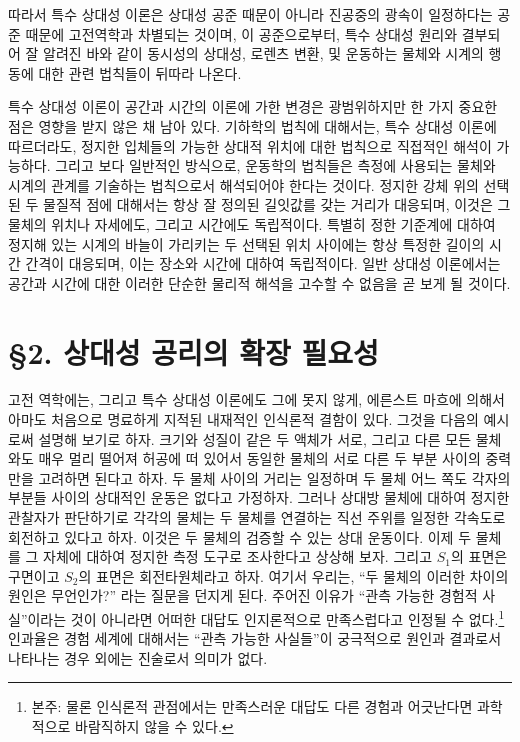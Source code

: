 따라서 특수 상대성 이론은 상대성 공준 때문이 아니라 진공중의 광속이 일정하다는 공준 때문에 고전역학과 차별되는 것이며, 이 공준으로부터, 특수 상대성 원리와 결부되어 잘 알려진 바와 같이 동시성의 상대성, 로렌츠 변환, 및 운동하는 물체와 시계의 행동에 대한 관련 법칙들이 뒤따라 나온다. 

특수 상대성 이론이 공간과 시간의 이론에 가한 변경은 광범위하지만 한 가지 중요한 점은 영향을 받지 않은 채 남아 있다.
기하학의 법칙에 대해서는, 특수 상대성 이론에 따르더라도, 정지한 입체들의 가능한 상대적 위치에 대한 법칙으로 직접적인 해석이 가능하다.
그리고 보다 일반적인 방식으로, 운동학의 법칙들은 측정에 사용되는 물체와 시계의 관계를 기술하는 법칙으로서 해석되어야 한다는 것이다.
정지한 강체 위의 선택된 두 물질적 점에 대해서는 항상 잘 정의된 길잇값를 갖는 거리가 대응되며, 이것은 그 물체의 위치나 자세에도, 그리고 시간에도 독립적이다. 특별히 정한 기준계에 대하여 정지해 있는 시계의 바늘이 가리키는 두 선택된 위치 사이에는 항상 특정한 길이의 시간 간격이 대응되며, 이는 장소와 시간에 대하여 독립적이다.
일반 상대성 이론에서는 공간과 시간에 대한 이러한 단순한 물리적 해석을 고수할 수 없음을 곧 보게 될 것이다.

\section*{\S 2. 상대성 공리의 확장 필요성}

고전 역학에는, 그리고 특수 상대성 이론에도 그에 못지 않게, 에른스트 마흐에 의해서 아마도 처음으로 명료하게 지적된 내재적인 인식론적 결함이 있다. 그것을 다음의 예시로써 설명해 보기로 하자. 크기와 성질이 같은 두 액체가 서로, 그리고 다른 모든 물체와도 매우 멀리 떨어져 허공에 떠 있어서 동일한 물체의 서로 다른 두 부분 사이의 중력만을 고려하면 된다고 하자. 두 물체 사이의 거리는 일정하며 두 물체 어느 쪽도 각자의 부분들 사이의 상대적인 운동은 없다고 가정하자. 그러나 상대방 물체에 대하여 정지한 관찰자가 판단하기로 각각의 물체는 두 물체를 연결하는 직선 주위를 일정한 각속도로 회전하고 있다고 하자. 이것은 두 물체의 검증할 수 있는 상대 운동이다. 이제 두 물체를 그 자체에 대하여 정지한 측정 도구로 조사한다고 상상해 보자. 그리고 $S_1$의 표면은 구면이고 $S_2$의 표면은 회전타원체라고 하자.
여기서 우리는, ``두 물체의 이러한 차이의 원인은 무언인가?'' 라는 질문을 던지게 된다. 주어진 이유가 ``관측 가능한 경험적 사실''이라는 것이 아니라면 어떠한 대답도 인지론적으로 만족스럽다고 인정될 수 없다.\footnote{본주: 물론 인식론적 관점에서는 만족스러운 대답도 다른 경험과 어긋난다면 과학적으로 바람직하지 않을 수 있다.} 인과율은 경험 세계에 대해서는 ``관측 가능한 사실들''이 궁극적으로 원인과 결과로서 나타나는 경우 외에는 진술로서 의미가 없다.

